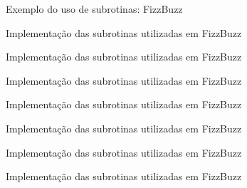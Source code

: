 \begin{frame}[fragile]{Exemplo do uso de subrotinas: FizzBuzz}
\end{frame}

\begin{frame}[fragile]{Implementação das subrotinas utilizadas em FizzBuzz}
\end{frame}

\begin{frame}[fragile]{Implementação das subrotinas utilizadas em FizzBuzz}
\end{frame}

\begin{frame}[fragile]{Implementação das subrotinas utilizadas em FizzBuzz}
\end{frame}

\begin{frame}[fragile]{Implementação das subrotinas utilizadas em FizzBuzz}
\end{frame}

\begin{frame}[fragile]{Implementação das subrotinas utilizadas em FizzBuzz}
\end{frame}

\begin{frame}[fragile]{Implementação das subrotinas utilizadas em FizzBuzz}
\end{frame}

\begin{frame}[fragile]{Implementação das subrotinas utilizadas em FizzBuzz}
\end{frame}
